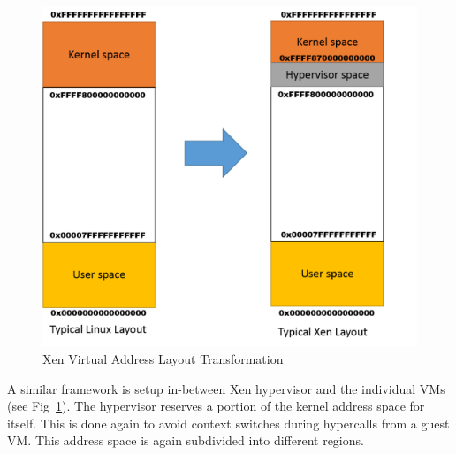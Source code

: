 \begin{figure}[H]
\centering
\includegraphics[scale=0.7]{figures/VA_layout_hypervisor.png}
\caption{Xen Virtual Address Layout Transformation}
\label{fig:xen_layout}
\end{figure}

A similar framework is setup in-between Xen hypervisor and the individual VMs (see Fig~\ref{fig:xen_layout}). The hypervisor reserves a portion of the kernel address space for itself. This is done again to avoid context switches during hypercalls from a guest VM. This address space is again subdivided into different regions. 

